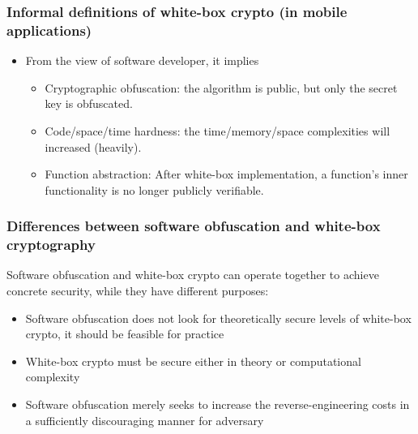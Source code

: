 \documentclass{beamer}
\begin{document}
\frame
{
\frametitle{Informal definitions of white-box crypto (in mobile applications)}
\begin{itemize}
\setlength{\itemsep}{12pt}
\item From the view of software developer, it implies
\begin{itemize}
\setlength{\itemsep}{12pt}
\item Cryptographic obfuscation: the algorithm is public, but only the secret key is obfuscated.

\item Code/space/time hardness: the time/memory/space complexities will increased (heavily).

\item Function abstraction: After white-box implementation, a function's inner functionality is no longer publicly verifiable.
\end{itemize}
\end{itemize}

}

\frame
{
\frametitle{Differences between software obfuscation and white-box cryptography}
Software obfuscation and white-box crypto can operate together to achieve concrete security, while they have different purposes:
\begin{itemize}
\setlength{\itemsep}{12pt}
\item Software obfuscation does not look for theoretically secure levels of white-box crypto, it should be feasible for practice

\item White-box crypto must be secure either in theory or computational complexity

\item Software obfuscation merely seeks to increase the reverse-engineering costs in a sufficiently discouraging manner for adversary
\end{itemize}

}
\end{document}
